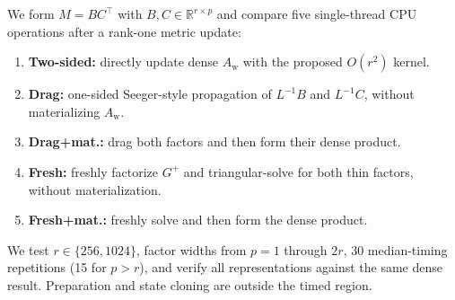 \documentclass[11pt]{article}
\newcommand{\Aw}{A_{\mathrm w}}
\newcommand{\R}{\mathbb{R}}
\begin{document}
We form \(M=BC^\top\) with \(B,C\in\R^{r\times p}\) and compare five
single-thread CPU operations after a rank-one metric update:
\begin{enumerate}
  \item \textbf{Two-sided:} directly update dense \(\Aw\) with the proposed
  \(O(r^2)\) kernel.
  \item \textbf{Drag:} one-sided Seeger-style propagation of
  \(L^{-1}B\) and \(L^{-1}C\), without materializing \(\Aw\).
  \item \textbf{Drag+mat.:} drag both factors and then form their dense
  product.
  \item \textbf{Fresh:} freshly factorize \(G^+\) and triangular-solve for
  both thin factors, without materialization.
  \item \textbf{Fresh+mat.:} freshly solve and then form the dense product.
\end{enumerate}
We test \(r\in\{256,1024\}\), factor widths from \(p=1\) through \(2r\), 30
median-timing repetitions (15 for \(p>r\)), and verify all representations
against the same dense result.  Preparation and state cloning are outside the
timed region.
\end{document}
